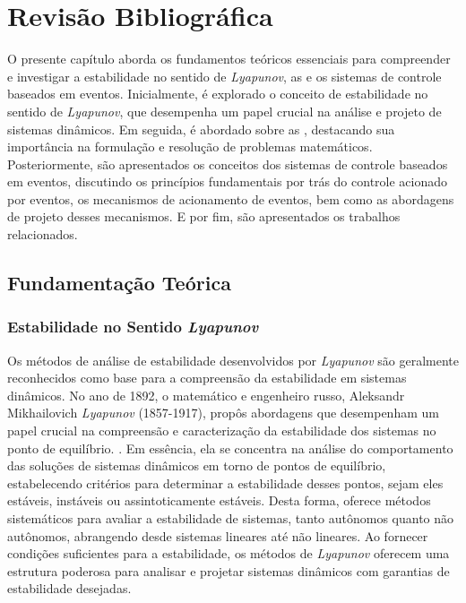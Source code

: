 \chapter{Revisão Bibliográfica} \label{cap2}

O presente capítulo aborda os fundamentos teóricos essenciais para compreender e investigar a estabilidade no sentido de \textit{Lyapunov}, as  e os sistemas de controle baseados em eventos. Inicialmente, é explorado o conceito de estabilidade no sentido de \textit{Lyapunov}, que desempenha um papel crucial na análise e projeto de sistemas dinâmicos. Em seguida, é abordado sobre as , destacando sua importância na formulação e resolução de problemas matemáticos. Posteriormente, são apresentados os conceitos dos sistemas de controle baseados em eventos, discutindo os princípios fundamentais por trás do controle acionado por eventos, os mecanismos de acionamento de eventos, bem como as abordagens de projeto desses mecanismos. E por fim, são apresentados os trabalhos relacionados.

\section{Fundamentação Teórica}

\subsection{Estabilidade no Sentido \textit{Lyapunov}}

Os métodos de análise de estabilidade desenvolvidos por \textit{Lyapunov }são geralmente reconhecidos como base para a compreensão da estabilidade em sistemas dinâmicos. No ano de 1892, o matemático e engenheiro russo, Aleksandr Mikhailovich \textit{Lyapunov} (1857-1917), propôs abordagens que desempenham um papel crucial na compreensão e caracterização da estabilidade dos sistemas no ponto de equilíbrio. \citep{lyapunov1892}. Em essência, ela se concentra na análise do comportamento das soluções de sistemas dinâmicos em torno de pontos de equilíbrio, estabelecendo critérios para determinar a estabilidade desses pontos, sejam eles estáveis, instáveis ou assintoticamente estáveis. Desta forma, oferece métodos sistemáticos para avaliar a estabilidade de sistemas, tanto autônomos quanto não autônomos, abrangendo desde sistemas lineares até não lineares. Ao fornecer condições suficientes para a estabilidade, os métodos de \textit{Lyapunov }oferecem uma estrutura poderosa para analisar e projetar sistemas dinâmicos com garantias de estabilidade desejadas.

